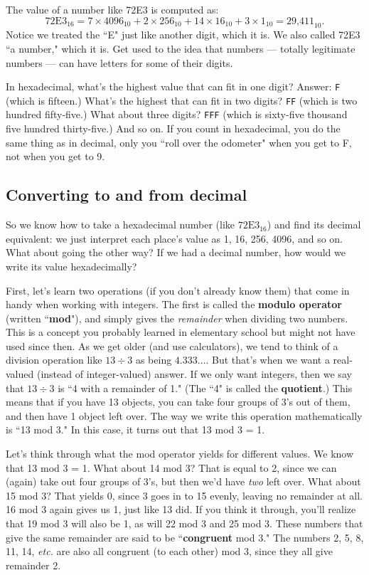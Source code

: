 The value of a number like 72E3 is computed as:
\[
\text{72E3}_{16} = 7 \times \text{4096}_{10} + 2 \times 256_{10} + 14 \times 16_{10} + 3
\times 1_{10} = \text{29,411}_{10}.
\]
Notice we treated the ``E" just like another digit, which it is. We also
called 72E3 ``a number," which it is. Get used to the idea that numbers ---
totally legitimate numbers --- can have letters for some of their digits.

In hexadecimal, what's the highest value that can fit in one digit?
Answer: \texttt{F} (which is fifteen.) What's the highest that can fit in
two digits? \texttt{FF} (which is two hundred fifty-five.) What about three
digits? \texttt{FFF} (which is sixty-five thousand five hundred
thirty-five.) And so on. If you count in hexadecimal, you do the same thing
as in decimal, only you ``roll over the odometer" when you get to F, not
when you get to 9.

\subsection{Converting to and from decimal}

So we know how to take a hexadecimal number (like $\text{72E3}_{16}$) and
find its decimal equivalent: we just interpret each place's value as 1, 16,
256, 4096, and so on. What about going the other way? If we had a decimal
number, how would we write its value hexadecimally?

First, let's learn two operations (if you don't already know them) that
come in handy when working with integers. The first is called the
\textbf{modulo operator} (written ``\textbf{mod}"), and simply gives the
\textit{remainder} when dividing two numbers. This is a concept you
probably learned in elementary school but might not have used since then.
As we get older (and use calculators), we tend to think of a division
operation like $13 \div 3$ as being $4.333\dots$. But that's when we want a
real-valued (instead of integer-valued) answer. If we only want integers,
then we say that $13 \div 3$ is ``4 with a remainder of 1." (The ``4" is
called the \textbf{quotient}.) This means that if you have 13 objects, you
can take four groups of 3's out of them, and then have 1 object left over.
The way we write this operation mathematically is ``13 mod 3." In this
case, it turns out that 13 mod 3 = 1.

Let's think through what the mod operator yields for different values. We
know that 13 mod 3 = 1. What about 14 mod 3? That is equal to 2, since we
can (again) take out four groups of 3's, but then we'd have \textit{two}
left over. What about 15 mod 3? That yields 0, since 3 goes in to 15
evenly, leaving no remainder at all. 16 mod 3 again gives us 1, just like
13 did.  If you think it through, you'll realize that 19 mod 3 will also be
1, as will 22 mod 3 and 25 mod 3. These numbers that give the same
remainder are said to be ``\textbf{congruent} mod 3." The numbers 2, 5, 8,
11, 14, \textit{etc.} are also all congruent (to each other) mod 3, since
they all give remainder 2.


